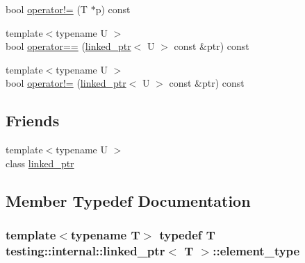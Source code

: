 \begin{DoxyCompactItemize}
\item 
bool \hyperlink{classtesting_1_1internal_1_1linked__ptr_a3685f9661bbe410cfa58fea2f14396b7}{operator!=} (T $\ast$p) const 
\item 
{\footnotesize template$<$typename U $>$ }\\bool \hyperlink{classtesting_1_1internal_1_1linked__ptr_a3b46c9ecfd928673a524dcb3c70fd2ad}{operator==} (\hyperlink{classtesting_1_1internal_1_1linked__ptr}{linked\+\_\+ptr}$<$ U $>$ const \&ptr) const 
\item 
{\footnotesize template$<$typename U $>$ }\\bool \hyperlink{classtesting_1_1internal_1_1linked__ptr_a6449584b90a09a313300599fb3a23633}{operator!=} (\hyperlink{classtesting_1_1internal_1_1linked__ptr}{linked\+\_\+ptr}$<$ U $>$ const \&ptr) const 
\end{DoxyCompactItemize}
\subsection*{Friends}
\begin{DoxyCompactItemize}
\item 
{\footnotesize template$<$typename U $>$ }\\class \hyperlink{classtesting_1_1internal_1_1linked__ptr_a7763f286ca03a7f7363a033d996c8c1c}{linked\+\_\+ptr}
\end{DoxyCompactItemize}


\subsection{Member Typedef Documentation}
\hypertarget{classtesting_1_1internal_1_1linked__ptr_a295c7d1ee4100d916514c4e4385a0063}{
\subsubsection[{element\+\_\+type}]{\setlength{\rightskip}{0pt plus 5cm}template$<$typename T$>$ typedef T {\bf testing\+::internal\+::linked\+\_\+ptr}$<$ T $>$\+::{\bf element\+\_\+type}}}\label{classtesting_1_1internal_1_1linked__ptr_a295c7d1ee4100d916514c4e4385a0063}


